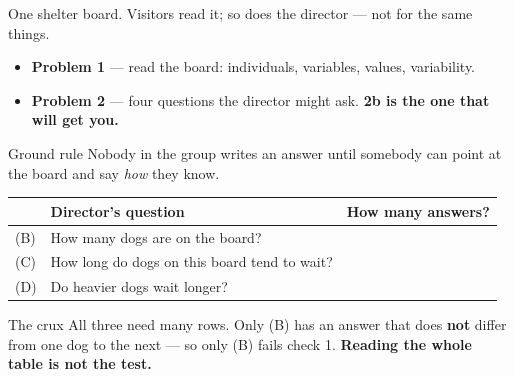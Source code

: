 \documentclass[aspectratio=169, 11pt]{beamer}
\newcommand{\redink}[1]{{\color{redacc}\bfseries #1}}
\begin{document}
\begin{frame}[t, plain]
  One shelter board. Visitors read it; so does the director --- not for the same things.
  \begin{itemize}\setlength{\itemsep}{5pt}
    \item \textbf{Problem 1} --- read the board: individuals, variables, values, variability.
    \item \textbf{Problem 2} --- four questions the director might ask. \redink{2b is the
          one that will get you.}
  \end{itemize}
  \begin{block}{Ground rule}
    Nobody in the group writes an answer until somebody can point at the board and say
    \emph{how} they know.
  \end{block}
\end{frame}

\begin{frame}[t, plain]
  \vspace{4pt}
  \renewcommand{\arraystretch}{1.5}
  \begin{tabularx}{\textwidth}{@{} l X C{3.4cm} @{}}
    \hline
    & \textbf{Director's question} & \textbf{How many answers?} \\
    \hline
    (B) & How many dogs are on the board?              & \\
    (C) & How long do dogs on this board tend to wait? & \\
    (D) & Do heavier dogs wait longer?                 & \\
    \hline
  \end{tabularx}
  \vspace{10pt}
  \begin{block}{The crux}
    All three need many rows. Only (B) has an answer that does \redink{not} differ from one dog
    to the next --- so only (B) fails check 1. \textbf{Reading the whole table is not the test.}
  \end{block}
\end{frame}
\end{document}
